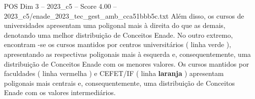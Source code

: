 \begin{textsample}{POS Dim 3 – 2023\_c5 – Score 4.00 – 2023\_c5/enade\_2023\_tec\_gest\_amb\_cca51bbb5c.txt}
Além disso, os cursos de universidades apresentam uma poligonal mais à direita do que as demais, denotando uma melhor distribuição de Conceitos Enade.
No outro extremo, encontram -se os cursos mantidos por centros universitários ( linha verde ), apresentando as respectivas poligonais mais à esquerda e, consequentemente, uma distribuição de Conceitos Enade com os menores valores.
Os cursos mantidos por faculdades ( linha vermelha ) e CEFET/IF ( linha \textbf{laranja} ) apresentam poligonais mais centrais e, consequentemente, uma distribuição de Conceitos Enade com os valores intermediários.

\end{textsample}
